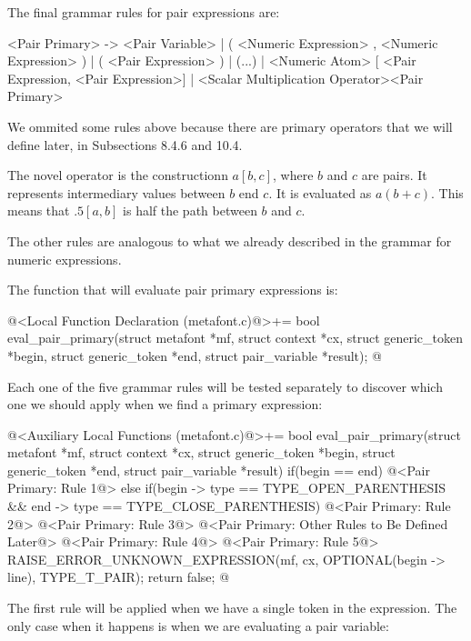 
The final grammar rules for pair expressions are:

\alinhaverbatim
<Pair Primary> -> <Pair Variable> |
                  ( <Numeric Expression> , <Numeric Expression> ) |
                  ( <Pair Expression> ) |
                  (...) |
                  <Numeric Atom> [ <Pair Expression, <Pair Expression>] |
                  <Scalar Multiplication Operator><Pair Primary>
\alinhanormal

We ommited some rules above because there are primary operators that
we will define later, in Subsections 8.4.6 and 10.4.

The novel operator is the constructionn $a[b, c]$, where $b$ and $c$
are pairs. It represents intermediary values between $b$ end $c$. It
is evaluated as $a(b+c)$. This means that $.5[a,b]$ is half the path
between $b$ and $c$.

The other rules are analogous to what we already described in the
grammar for numeric expressions.

The function that will evaluate pair primary expressions is:

\iniciocodigo
@<Local Function Declaration (metafont.c)@>+=
bool eval_pair_primary(struct metafont *mf, struct context *cx,
                       struct generic_token *begin,
                       struct generic_token *end,
                       struct pair_variable *result);
@
\fimcodigo

Each one of the five grammar rules will be tested separately to
discover which one we should apply when we find a primary expression:

\iniciocodigo
@<Auxiliary Local Functions (metafont.c)@>+=
bool eval_pair_primary(struct metafont *mf, struct context *cx,
                       struct generic_token *begin,
                       struct generic_token *end,
                       struct pair_variable *result){
  if(begin == end){
    @<Pair Primary: Rule 1@>
  }
  else if(begin -> type == TYPE_OPEN_PARENTHESIS &&
          end -> type == TYPE_CLOSE_PARENTHESIS){
    @<Pair Primary: Rule 2@>
    @<Pair Primary: Rule 3@>
  }
  @<Pair Primary: Other Rules to Be Defined Later@>
  @<Pair Primary: Rule 4@>
  @<Pair Primary: Rule 5@>
  RAISE_ERROR_UNKNOWN_EXPRESSION(mf, cx, OPTIONAL(begin -> line), TYPE_T_PAIR);
  return false;
}
@

The first rule will be applied when we have a single token in the
expression. The only case when it happens is when we are evaluating a
pair variable:

